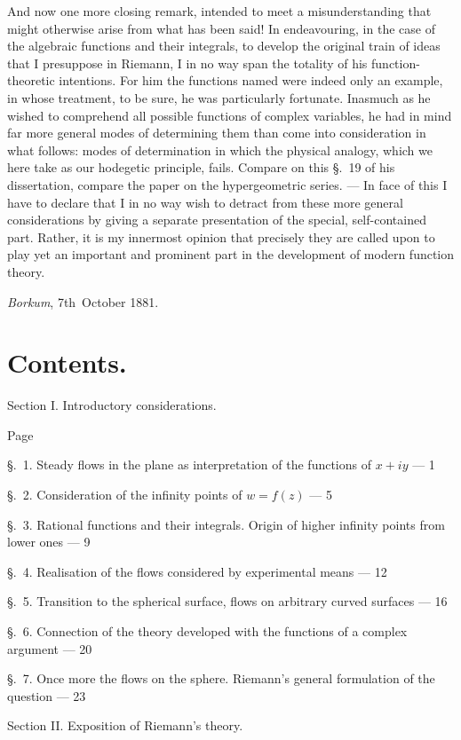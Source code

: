 \documentclass{article}
\begin{document}
And now one more closing remark, intended to meet a misunderstanding that might otherwise arise from what has been said! In endeavouring, in the case of the algebraic functions and their integrals, to develop the original train of ideas that I presuppose in Riemann, I in no way span the totality of his function-theoretic intentions. For him the functions named were indeed only an example, in whose treatment, to be sure, he was particularly fortunate. Inasmuch as he wished to comprehend all possible functions of complex variables, he had in mind far more general modes of determining them than come into consideration in what follows: modes of determination in which the physical analogy, which we here take as our hodegetic principle, fails. Compare on this §.~19 of his dissertation, compare the paper on the hypergeometric series. --- In face of this I have to declare that I in no way wish to detract from these more general considerations by giving a separate presentation of the special, self-contained part. Rather, it is my innermost opinion that precisely they are called upon to play yet an important and prominent part in the development of modern function theory.

\emph{Borkum}, 7th~October 1881.


\section*{Contents.}

Section I. Introductory considerations.

Page

§.~1. Steady flows in the plane as interpretation of the functions of $x + iy$ --- 1

§.~2. Consideration of the infinity points of $w = f(z)$ --- 5

§.~3. Rational functions and their integrals. Origin of higher infinity points from lower ones --- 9

§.~4. Realisation of the flows considered by experimental means --- 12

§.~5. Transition to the spherical surface, flows on arbitrary curved surfaces --- 16

§.~6. Connection of the theory developed with the functions of a complex argument --- 20

§.~7. Once more the flows on the sphere. Riemann's general formulation of the question --- 23

Section II. Exposition of Riemann's theory.
\end{document}
